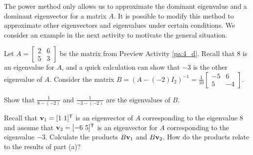 \label{sec:power_method_inv}

The power method only allows us to approximate the dominant eigenvalue and a dominant eigenvector for a matrix $A$. It is possible to modify this method to approximate other eigenvectors and eigenvalues under certain conditions. We consider an example in the next activity to motivate the general situation.



\begin{activity} \label{act:4_e_2} Let $A = \left[ \begin{array}{cc} 2&6 \\ 5&3 \end{array} \right]$ be the matrix from Preview Activity \ref{pa:4_d}. Recall that $8$ is an eigenvalue for $A$, and a quick calculation can show that $-3$ is the other eigenvalue of $A$. Consider the matrix $B = (A - (-2)I_2)^{-1} = \frac{1}{10}\left[ \begin{array}{rr} -5&6 \\ 5&-4 \end{array} \right]$. 
	\ba
	\item Show that $\frac{1}{8-(-2)}$ and $\frac{1}{-3-(-2)}$ are the eigenvalues of $B$. 



	\item Recall that $\mathbf{v}_1 = [1 \ 1]^{\mathsf{T}}$ is an eigenvector of $A$ corresponding to the eigenvalue $8$ and assume that $\vv_2 = [-6 \ 5]^{\tr}$ is an eigenvector for $A$ corresponding to the eigenvalue $-3$. Calculate the products $B \mathbf{v}_1$ and $B \mathbf{v}_2$. How do the products relate to the results of part (a)? 



	\ea
	
\end{activity}




